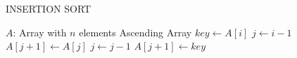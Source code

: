 \documentclass{article}
\begin{document}
    \begin{CJK*}{UTF8}{gkai}
        \begin{algorithm}
            \caption{INSERTION SORT}
            \begin{algorithmic}[1]
                \Require $A$: Array with $n$ elements
                \Ensure Ascending Array
                    \State $key \gets A[i]$
                    \State $j \gets i - 1$
                        \State $A[j + 1] \gets A[j]$
                        \State $j \gets j - 1$
                    \EndWhile
                    \State $A[j + 1] \gets key$
                \EndFor
            \end{algorithmic}
        \end{algorithm}
    \end{CJK*}
\end{document}
